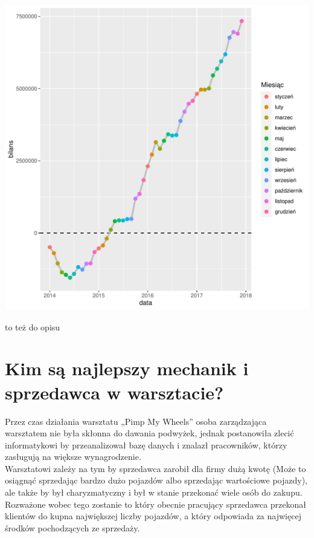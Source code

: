 \documentclass{article}\usepackage[]{graphicx}\usepackage[]{xcolor}
\makeatletter
\def\maxwidth{ %
  \ifdim\Gin@nat@width>\linewidth
    \linewidth
  \else
    \Gin@nat@width
  \fi
}
\newenvironment{knitrout}{}{} %
\makeatother
\begin{document}
\begin{knitrout}
\color{fgcolor}

{\centering \includegraphics[width=\maxwidth]{figure/unnamed-chunk-8-1} 

}


\end{knitrout}

{\color{red} to też do opisu}


\section{Kim są najlepszy mechanik i sprzedawca w warsztacie?}

Przez czas działania warsztatu „Pimp My Wheels” osoba zarządzająca warsztatem nie była skłonna do dawania podwyżek, jednak postanowiła zlecić informatykowi by przeanalizował bazę danych i znalazł pracowników, którzy zasługują na większe wynagrodzenie. \\

Warsztatowi zależy na tym by sprzedawca zarobił dla firmy dużą kwotę (Może to osiągnąć sprzedając bardzo dużo pojazdów albo sprzedając wartościowe pojazdy), ale także by był charyzmatyczny i był w stanie przekonać wiele osób do zakupu. Rozważone wobec tego zostanie to który obecnie pracujący sprzedawca przekonał klientów do kupna największej liczby pojazdów, a który odpowiada za najwięcej środków pochodzących ze sprzedaży. \\
\end{document}
